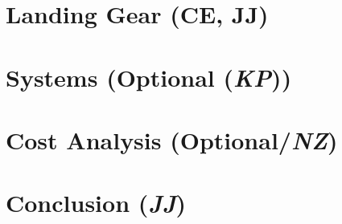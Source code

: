 \documentclass[conf]{new-aiaa}
\begin{document}
\section{Landing Gear (CE, JJ)}


\section{Systems (Optional (\textit{KP}))}


\section{Cost Analysis (Optional/\textit{NZ})}


\section{Conclusion (\textit{JJ})}



% 


\end{document}

